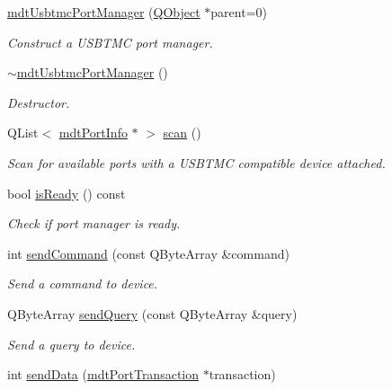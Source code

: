 \begin{DoxyCompactItemize}
\item 
\hyperlink{classmdt_usbtmc_port_manager_a99a24e4360e70ffc63677dbe888513f7}{mdt\-Usbtmc\-Port\-Manager} (\hyperlink{class_q_object}{Q\-Object} $\ast$parent=0)
\begin{DoxyCompactList}\small\item\em Construct a U\-S\-B\-T\-M\-C port manager. \end{DoxyCompactList}\item 
\hyperlink{classmdt_usbtmc_port_manager_aad6b2eef9b5cfb5c324affb6962a463b}{$\sim$mdt\-Usbtmc\-Port\-Manager} ()
\begin{DoxyCompactList}\small\item\em Destructor. \end{DoxyCompactList}\item 
Q\-List$<$ \hyperlink{classmdt_port_info}{mdt\-Port\-Info} $\ast$ $>$ \hyperlink{classmdt_usbtmc_port_manager_a992d1227810186d3c7dc166452e2e3b6}{scan} ()
\begin{DoxyCompactList}\small\item\em Scan for available ports with a U\-S\-B\-T\-M\-C compatible device attached. \end{DoxyCompactList}\item 
bool \hyperlink{classmdt_usbtmc_port_manager_a0b90ceb0bbf424222ec878a355d206d7}{is\-Ready} () const 
\begin{DoxyCompactList}\small\item\em Check if port manager is ready. \end{DoxyCompactList}\item 
int \hyperlink{classmdt_usbtmc_port_manager_af6abc4a3693fc386a12f346f57282c11}{send\-Command} (const Q\-Byte\-Array \&command)
\begin{DoxyCompactList}\small\item\em Send a command to device. \end{DoxyCompactList}\item 
Q\-Byte\-Array \hyperlink{classmdt_usbtmc_port_manager_acbbb8539c54034989b2ea6f6071e90bf}{send\-Query} (const Q\-Byte\-Array \&query)
\begin{DoxyCompactList}\small\item\em Send a query to device. \end{DoxyCompactList}\item 
int \hyperlink{classmdt_usbtmc_port_manager_a205901666c797055bee1902bd1e1e09c}{send\-Data} (\hyperlink{classmdt_port_transaction}{mdt\-Port\-Transaction} $\ast$transaction)

\end{DoxyCompactItemize}
